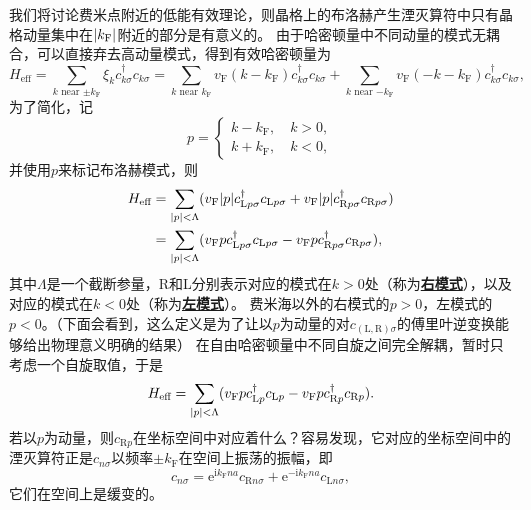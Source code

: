 \documentclass[hyperref, UTF8, a4paper]{ctexart}
\newcommand*{\ii}{\mathrm{i}}
\newcommand*{\ee}{\mathrm{e}}
\newcommand*{\concept}[1]{\underline{\textbf{#1}}}
\begin{document}
我们将讨论费米点附近的低能有效理论，则晶格上的布洛赫产生湮灭算符中只有晶格动量集中在$\abs{k_\text{F}}$附近的部分是有意义的。
由于哈密顿量中不同动量的模式无耦合，可以直接弃去高动量模式，得到有效哈密顿量为
\[
    {H}_\text{eff} = \sum_{\text{$k$ near $\pm k_\text{F}$}} \xi_k {c}^\dagger_{k \sigma} {c}_{k \sigma} = \sum_{\text{$k$ near $k_\text{F}$}} v_\text{F} (k - k_\text{F}) {c}^\dagger_{k \sigma} {c}_{k \sigma} + \sum_{\text{$k$ near $-k_\text{F}$}} v_\text{F} ( - k - k_\text{F}) {c}^\dagger_{k \sigma} {c}_{k \sigma}  ,
\]
为了简化，记
\begin{equation}
    p = \begin{cases}
        k - k_\text{F}, \quad k > 0, \\
        k + k_\text{F} , \quad k < 0,
    \end{cases}
\end{equation}
并使用$p$来标记布洛赫模式，则
\begin{equation}
    \begin{aligned}
        {H}_\text{eff} &= \sum_{\abs{p} < \Lambda} (v_\text{F} \abs{p} {c}^\dagger_{ \text{L} p\sigma} {c}_{\text{L} p\sigma} + v_\text{F} \abs{p} {c}^\dagger_{ \text{R} p\sigma} {c}_{\text{R} p\sigma}) \\
        &= \sum_{\abs{p} < \Lambda} (v_\text{F} p {c}^\dagger_{ \text{L} p\sigma} {c}_{\text{L} p\sigma} - v_\text{F} p {c}^\dagger_{ \text{R} p\sigma} {c}_{\text{R} p\sigma}),
    \end{aligned}
\end{equation}
其中$\Lambda$是一个截断参量，R和L分别表示对应的模式在$k>0$处（称为\concept{右模式}），以及对应的模式在$k<0$处（称为\concept{左模式}）。
费米海以外的右模式的$p>0$，左模式的$p < 0$。（下面会看到，这么定义是为了让以$p$为动量的对${c}_{(\text{L}, \text{R}) \sigma}$的傅里叶逆变换能够给出物理意义明确的结果）
在自由哈密顿量中不同自旋之间完全解耦，暂时只考虑一个自旋取值，于是
\begin{equation}
    {H}_\text{eff} = \sum_{\abs{p} < \Lambda} (v_\text{F} p {c}^\dagger_{\text{L} p} {c}_{\text{L} p} - v_\text{F} p {c}^\dagger_{\text{R} p} {c}_{\text{R} p}).
    \label{eq:one-dimension-linear-model}
\end{equation}
若以$p$为动量，则${c}_{\text{R} p}$在坐标空间中对应着什么？容易发现，它对应的坐标空间中的湮灭算符正是${c}_{n\sigma}$以频率$\pm k_\text{F}$在空间上振荡的振幅，即
\begin{equation}
    {c}_{n\sigma} = \ee^{\ii k_\text{F} na} {c}_{\text{R} n \sigma } + \ee^{ - \ii k_\text{F} na} {c}_{\text{L} n \sigma},
\end{equation}
它们在空间上是缓变的。%
\end{document}
